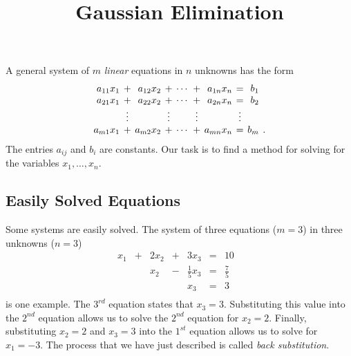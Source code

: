 \documentclass{ximera}
\title{Gaussian Elimination}
\begin{document}
\begin{abstract}
\end{abstract}
\maketitle

  \label{S:Gauss}

A general system of $m$ {\em linear\/} equations 
in $n$ unknowns has the form
\begin{equation}    \label{general}
\arraycolsep 2pt
\begin{array}{rcrcrcrcrl}
 a_{11}x_1 & + & a_{12}x_2 & + & \cdots & + & a_{1n}x_n & = &   b_1
& \\
 a_{21}x_1 & + & a_{22}x_2 & + & \cdots & + & a_{2n}x_n & = &   b_2
& \\
        & \vdots &      & \vdots &    & \vdots &     & \vdots &
  & \\
 a_{m1}x_1 & + & a_{m2}x_2 & + & \cdots & + & a_{mn}x_n & = &   b_m
& .
\end{array}
\end{equation}
The entries $a_{ij}$ and $b_i$ are constants.  Our task is to find
a method for solving  for the variables
$x_1,\ldots,x_n$.

\subsection*{Easily Solved Equations}

Some systems are easily solved.  The system of three
equations ($m=3$) in three unknowns ($n=3$)
\begin{equation}
\begin{array}{rcrcrcrl} \label{examp3}
  x_1 & + & 2x_2 & + & 3x_3 & = &  10  & \\
      &   &  x_2 & - & \frac{1}{5}x_3 & = & \frac{7}{5}  & \\
      &   &      &   &  x_3 & = &   3  & \\
\end{array}
\end{equation}
is one example.  The $3^{rd}$ equation states that $x_3=3$.
Substituting this value into the $2^{nd}$ equation allows us to
solve the $2^{nd}$ equation for $x_2=2$.  Finally, substituting
$x_2=2$ and $x_3=3$ into the $1^{st}$ equation allows us to
solve for $x_1=-3$.  The process that we have just described is
called {\em back substitution\/}.
\end{document}
